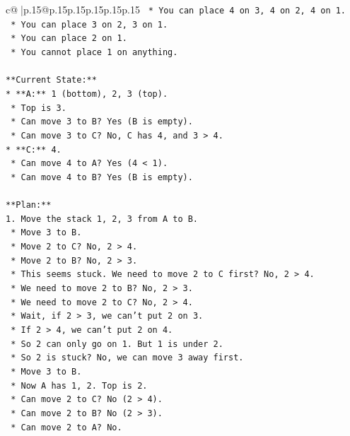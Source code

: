\documentclass{article}
\begin{document}
{\begin{supertabular}{c@{$\;$}|p{.15\linewidth}@{}p{.15\linewidth}p{.15\linewidth}p{.15\linewidth}p{.15\linewidth}p{.15\linewidth}}
{{{\texttt{    *   You can place 4 on 3, 4 on 2, 4 on 1.} \\
\texttt{    *   You can place 3 on 2, 3 on 1.} \\
\texttt{    *   You can place 2 on 1.} \\
\texttt{    *   You cannot place 1 on anything.} \\
\\ 
\texttt{**Current State:**} \\
\texttt{*   **A:** 1 (bottom), 2, 3 (top).} \\
\texttt{    *   Top is 3.} \\
\texttt{    *   Can move 3 to B? Yes (B is empty).} \\
\texttt{    *   Can move 3 to C? No, C has 4, and 3 > 4.} \\
\texttt{*   **C:** 4.} \\
\texttt{    *   Can move 4 to A? Yes (4 < 1).} \\
\texttt{    *   Can move 4 to B? Yes (B is empty).} \\
\\ 
\texttt{**Plan:**} \\
\texttt{1.  Move the stack 1, 2, 3 from A to B.} \\
\texttt{    *   Move 3 to B.} \\
\texttt{    *   Move 2 to C? No, 2 > 4.} \\
\texttt{    *   Move 2 to B? No, 2 > 3.} \\
\texttt{    *   This seems stuck. We need to move 2 to C first? No, 2 > 4.} \\
\texttt{    *   We need to move 2 to B? No, 2 > 3.} \\
\texttt{    *   We need to move 2 to C? No, 2 > 4.} \\
\texttt{    *   Wait, if 2 > 3, we can't put 2 on 3.} \\
\texttt{    *   If 2 > 4, we can't put 2 on 4.} \\
\texttt{    *   So 2 can only go on 1. But 1 is under 2.} \\
\texttt{    *   So 2 is stuck? No, we can move 3 away first.} \\
\texttt{    *   Move 3 to B.} \\
\texttt{    *   Now A has 1, 2. Top is 2.} \\
\texttt{    *   Can move 2 to C? No (2 > 4).} \\
\texttt{    *   Can move 2 to B? No (2 > 3).} \\
\texttt{    *   Can move 2 to A? No.} \\
}}}
\end{supertabular}}
\end{document}
